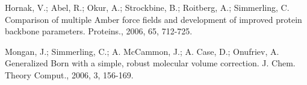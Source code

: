 \documentclass[12pt]{article}
\begin{document}
\begin{thebibliography}{99}
Hornak, V.; Abel, R.; Okur, A.; Strockbine, B.; Roitberg, A.; Simmerling, C. Comparison of multiple Amber force fields
and development of improved protein backbone parameters. Proteins., 2006, 65, 712-725.

Mongan, J.; Simmerling, C.; A. McCammon, J.; A. Case, D.; Onufriev, A. Generalized
Born with a simple, robust molecular volume correction. J. Chem. Theory Comput.,
2006, 3, 156-169.


\end{thebibliography}
\end{document}
